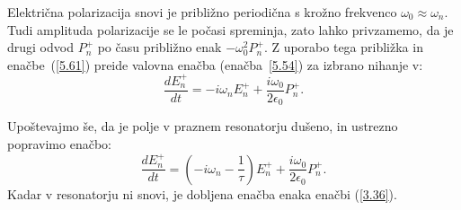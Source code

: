 Električna polarizacija snovi je približno periodična s krožno frekvenco $\omega_0 \approx \omega_n$.
Tudi amplituda polarizacije se le počasi spreminja, zato lahko privzamemo, da je 
drugi odvod $P_n^+$ po času približno enak $-\omega_0^2 P_n^+$. Z uporabo tega
približka in enačbe~(\ref{5.61}) preide valovna enačba (enačba~\ref{5.54}) za izbrano nihanje v:
\begin{equation}  
\label{5.62}
\frac{dE_n^+}{dt}=-i \omega_n E_n^++
\frac{i \omega_0}{2\epsilon_0}P_n^+.
\end{equation}

Upoštevajmo še, da je polje v praznem resonatorju dušeno, in ustrezno 
popravimo enačbo:
\begin{equation}  
\label{5.63}
\frac{dE_n^+}{dt}=\left(-i \omega_n-\frac{1}{\tau}\right) E_n^+ 
+\frac{i \omega_0}{2\epsilon_0}P_n^+.
\end{equation}
Kadar v resonatorju ni snovi, je dobljena enačba enaka enačbi (\ref{3.36}).

